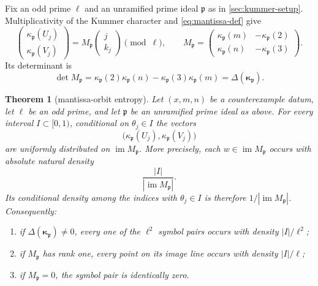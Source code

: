 \documentclass[11pt,oneside]{article}
\newtheorem{theorem}{Theorem}[section]
\theoremstyle{definition}
\theoremstyle{remark}
\begin{document}
Fix an odd prime $\ell$ and an unramified prime ideal $\mathfrak p$ as in
\cref{sec:kummer-setup}.  Multiplicativity of the Kummer character and
\eqref{eq:mantissa-def} give
\begin{equation}\label{eq:mantissa-kappa}
 \begin{pmatrix}
  \kappa_{\mathfrak p}(U_j)\\
  \kappa_{\mathfrak p}(V_j)
 \end{pmatrix}
 =
 M_{\mathfrak p}
 \begin{pmatrix}j\\k_j\end{pmatrix}
 \pmod\ell,
 \qquad
 M_{\mathfrak p}=
 \begin{pmatrix}
  \kappa_{\mathfrak p}(m)&-\kappa_{\mathfrak p}(2)\\
  \kappa_{\mathfrak p}(n)&-\kappa_{\mathfrak p}(3)
 \end{pmatrix}.
\end{equation}
Its determinant is
\begin{equation}\label{eq:mantissa-det}
 \det M_{\mathfrak p}
 =\kappa_{\mathfrak p}(2)\kappa_{\mathfrak p}(n)
  -\kappa_{\mathfrak p}(3)\kappa_{\mathfrak p}(m)
 =\Delta(\boldsymbol\kappa_{\mathfrak p}).
\end{equation}

\begin{theorem}[mantissa-orbit entropy]\label{thm:mantissa-entropy}
Let $(x,m,n)$ be a counterexample datum, let $\ell$ be an odd prime, and let
$\mathfrak p$ be an unramified prime ideal as above.  For every interval
$I\subset[0,1)$, conditional on $\theta_j\in I$ the vectors
\[
 \bigl(\kappa_{\mathfrak p}(U_j),
       \kappa_{\mathfrak p}(V_j)\bigr)
\]
are uniformly distributed on $\operatorname{im}M_{\mathfrak p}$.  More precisely, each
$w\in\operatorname{im}M_{\mathfrak p}$ occurs with absolute natural density
\[
 \frac{|I|}{|\operatorname{im}M_{\mathfrak p}|}.
\]
Its conditional density among the indices with $\theta_j\in I$ is therefore
$1/|\operatorname{im}M_{\mathfrak p}|$.
Consequently:
\begin{enumerate}
\item if $\Delta(\boldsymbol\kappa_{\mathfrak p})\ne0$, every one of the
      $\ell^2$ symbol pairs occurs with density $|I|/\ell^2$;
\item if $M_{\mathfrak p}$ has rank one, every point on its image line occurs
      with density $|I|/\ell$;
\item if $M_{\mathfrak p}=0$, the symbol pair is identically zero.
\end{enumerate}
\end{theorem}
\end{document}
